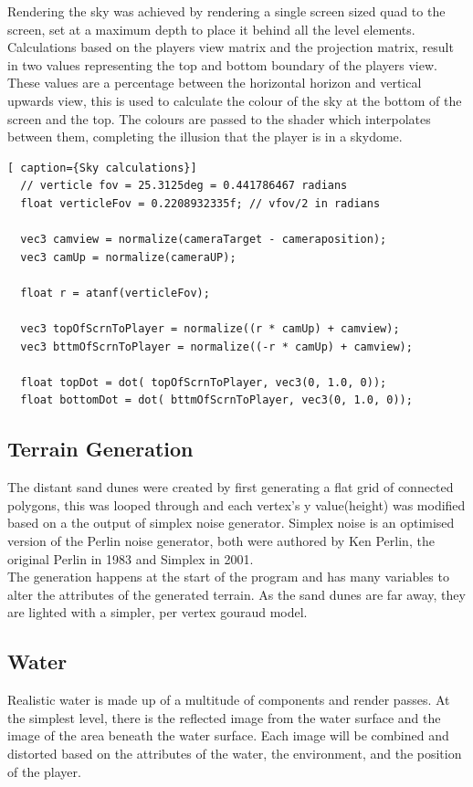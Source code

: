 \documentclass[conference]{acmsiggraph}
\begin{document}
Rendering the sky was achieved by rendering a single screen sized quad to the screen, set at a maximum depth to place it behind all the level elements. Calculations based on the players view matrix and the projection matrix, result in two values representing the top and bottom boundary of the players view. These values are a percentage between the horizontal horizon and vertical upwards view, this is used to calculate the colour of the sky at the bottom of the screen and the top. The colours are passed to the shader which interpolates between them, completing the illusion that the player is in a skydome.

\begin{lstlisting}[ caption={Sky calculations}]
  // verticle fov = 25.3125deg = 0.441786467 radians
  float verticleFov = 0.2208932335f; // vfov/2 in radians

  vec3 camview = normalize(cameraTarget - cameraposition);
  vec3 camUp = normalize(cameraUP);

  float r = atanf(verticleFov);

  vec3 topOfScrnToPlayer = normalize((r * camUp) + camview);
  vec3 bttmOfScrnToPlayer = normalize((-r * camUp) + camview);

  float topDot = dot( topOfScrnToPlayer, vec3(0, 1.0, 0));
  float bottomDot = dot( bttmOfScrnToPlayer, vec3(0, 1.0, 0));
\end{lstlisting}


\subsection{Terrain Generation}
The distant sand dunes were created by first generating a flat grid of connected polygons, this was looped through and each vertex's y value(height) was modified based on a the output of simplex noise generator. Simplex noise is an optimised version of the Perlin noise generator, both were authored by Ken Perlin, the original Perlin in 1983 and Simplex in 2001.\\
The generation happens at the start of the program and has many variables to alter the attributes of the generated terrain. As the sand dunes are far away, they are lighted with a simpler, per vertex gouraud model.

\subsection{Water}

Realistic water is made up of a multitude of components and render passes. At the simplest level, there is the reflected image from the water surface and the image of the area beneath the water surface. Each image will be combined and distorted based on the attributes of the water, the environment, and the position of the player.
\end{document}
